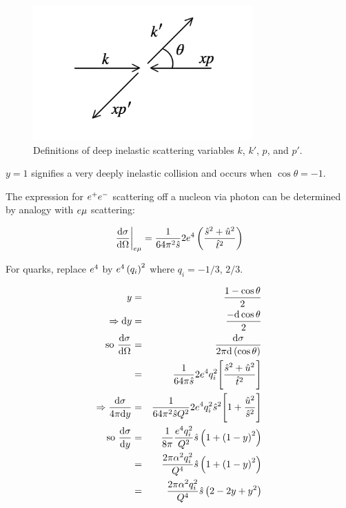 \begin{figure}[!htb]
  \begin{center}
    \includegraphics[width=0.75\textwidth]{images/web_feynman/image_63.png}
    \caption[Deep inelastic scattering variables]{Definitions of deep inelastic scattering variables $k$, $k'$, $p$, and $p'$.}
    \label{fig:ch14_DISVariables}
  \end{center}
\end{figure}

$y = 1$ signifies a very deeply inelastic collision and occurs when $\cos\theta = -1$.

The expression for $e^+e^-$ scattering off a nucleon via photon can be determined by analogy with $e\mu$ scattering:

\[
  \left.\frac{\mathrm{d}\sigma}{\mathrm{d}\Omega}\right|_{e\mu} = \frac{1}{64\pi^2\hat{s}}2e^4\left(\frac{\hat{s}^2 + \hat{u}^2}{\hat{t}^2}\right)
\]

For quarks, replace $e^4$ by $e^4\left(q_i\right)^2$ where $q_i = -1/3$, $2/3$.

\begin{eqnarray*}
  y & = & \frac{1 - \cos\theta}{2} \\
  \Rightarrow \mathrm{d}y & = & \frac{-\mathrm{d}\cos\theta}{2} \\
  \textrm{so } \frac{\mathrm{d}\sigma}{\mathrm{d}\Omega} & = & \frac{\mathrm{d}\sigma}{2\pi\mathrm{d}\left(\cos\theta\right)} \\
  & = & \frac{1}{64\pi\hat{s}}2e^4q_i^2\Bigg[ \frac{\hat{s}^2 + \hat{u}^2}{\hat{t}^2}\Bigg] \\
  \Rightarrow \frac{\mathrm{d}\sigma}{4\pi\mathrm{d}y} & = & \frac{1}{64\pi^2\hat{s}Q^2}2e^4q_i^2\hat{s}^2\Bigg[ 1 + \frac{\hat{u}^2}{\hat{s}^2}\Bigg] \\ 
  \textrm{so } \frac{\mathrm{d}\sigma}{\mathrm{d}y} & = & \frac{1}{8\pi}\frac{e^4q_i^2}{Q^2}\hat{s}\left(1 + \left(1 - y\right)^2\right) \\
  & = & \frac{2\pi\alpha^2q_i^2}{Q^4}\hat{s}\left(1 + \left(1 - y\right)^2\right) \\
  & = & \frac{2\pi\alpha^2 q_i^2}{Q^4}\hat{s}\left(2 - 2y + y^2\right)
\end{eqnarray*}

